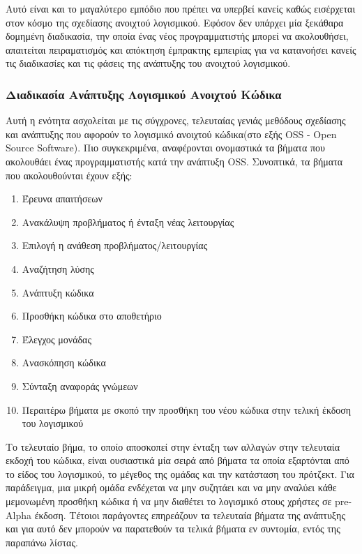 \documentclass[a4paper, 11pt]{article}
\begin{document}
{{Αυτό είναι και το μαγαλύτερο εμπόδιο που πρέπει να υπερβεί κανείς καθώς εισέρχεται στον κόσμο της σχεδίασης ανοιχτού λογισμικού. Εφόσον δεν υπάρχει μία ξεκάθαρα δομημένη διαδικασία, την οποία ένας νέος προγραμματιστής μπορεί να ακολουθήσει, απαιτείται πειραματισμός και απόκτηση έμπρακτης εμπειρίας για να κατανοήσει κανείς τις διαδικασίες και τις φάσεις της ανάπτυξης του ανοιχτού λογισμικού.

\subsubsection{Διαδικασία Ανάπτυξης Λογισμικού Ανοιχτού Κώδικα}

Αυτή η ενότητα ασχολείται με τις σύγχρονες, τελευταίας γενιάς μεθόδους σχεδίασης και ανάπτυξης που αφορούν το λογισμικό ανοιχτού κώδικα(στο εξής \textlatin{OSS - Open Source Software}). Πιο συγκεκριμένα, αναφέρονται ονομαστικά τα βήματα που ακολουθάει ένας προγραμματιστής κατά την ανάπτυξη \textlatin{OSS}. Συνοπτικά, τα βήματα που ακολουθούνται έχουν εξής:

\begin{enumerate}
    \item Έρευνα απαιτήσεων
    \item Ανακάλυψη προβλήματος ή ένταξη νέας λειτουργίας
    \item Επιλογή η ανάθεση προβλήματος/λειτουργίας
    \item Αναζήτηση λύσης
    \item Ανάπτυξη κώδικα
    \item Προσθήκη κώδικα στο αποθετήριο
    \item Έλεγχος μονάδας
    \item Ανασκόπηση κώδικα
    \item Σύνταξη αναφοράς γνώμεων
    \item Περαιτέρω βήματα με σκοπό την προσθήκη του νέου κώδικα στην τελική έκδοση του λογισμικού
\end{enumerate}

Το τελευταίο βήμα, το οποίο αποσκοπεί στην ένταξη των αλλαγών στην τελευταία εκδοχή του κώδικα, είναι ουσιαστικά μία σειρά από βήματα τα οποία εξαρτόνται από το είδος του λογισμικού, το μέγεθος της ομάδας και την κατάσταση του πρότζεκτ. Για παράδειγμα, μια μικρή ομάδα ενδέχεται να μην συζητάει και να μην αναλύει κάθε μεμονωμένη προσθήκη κώδικα ή να μην διαθέτει το λογισμικό στους χρήστες σε \textlatin{pre-Alpha} έκδοση. Τέτοιοι παράγοντες επηρεάζουν τα τελευταία βήματα της ανάπτυξης και για αυτό δεν μπορούν να παρατεθούν τα τελικά βήματα εν συντομία, εντός της παραπάνω λίστας.

}}
\end{document}
